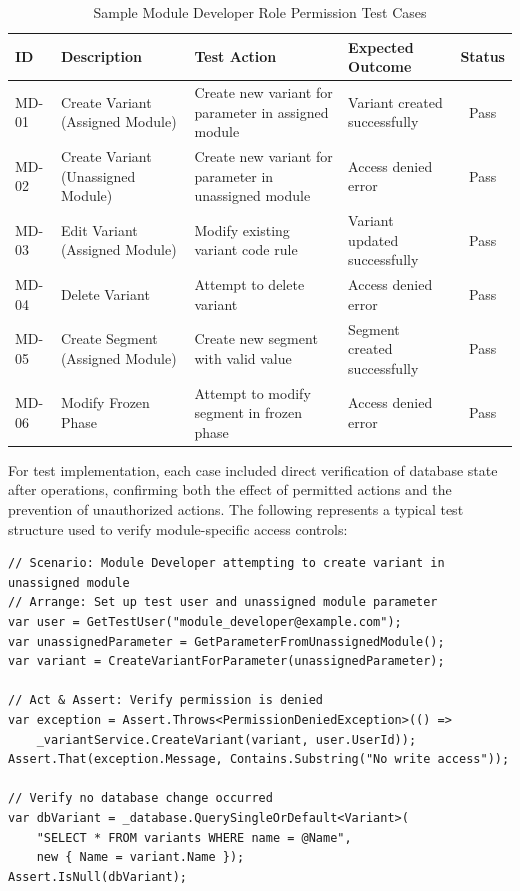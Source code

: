 \begin{table}[H]
\centering
\caption{Sample Module Developer Role Permission Test Cases}
\label{tab:module-dev-test-cases}
\begin{tabular}{|p{0.7cm}|p{3.5cm}|p{3.7cm}|p{3.7cm}|c|}
\hline
\textbf{ID} & \textbf{Description} & \textbf{Test Action} & \textbf{Expected Outcome} & \textbf{Status} \\
\hline
MD-01 & Create Variant (Assigned Module) & Create new variant for parameter in assigned module & Variant created successfully & Pass \\
\hline
MD-02 & Create Variant (Unassigned Module) & Create new variant for parameter in unassigned module & Access denied error & Pass \\
\hline
MD-03 & Edit Variant (Assigned Module) & Modify existing variant code rule & Variant updated successfully & Pass \\
\hline
MD-04 & Delete Variant & Attempt to delete variant & Access denied error & Pass \\
\hline
MD-05 & Create Segment (Assigned Module) & Create new segment with valid value & Segment created successfully & Pass \\
\hline
MD-06 & Modify Frozen Phase & Attempt to modify segment in frozen phase & Access denied error & Pass \\
\hline
\end{tabular}
\end{table}

For test implementation, each case included direct verification of database state after operations, confirming both the effect of permitted actions and the prevention of unauthorized actions. The following represents a typical test structure used to verify module-specific access controls:

\begin{lstlisting}[language=CSharp, caption={Representative Test Case Structure}, label={lst:test-case-structure}]
// Scenario: Module Developer attempting to create variant in unassigned module
// Arrange: Set up test user and unassigned module parameter
var user = GetTestUser("module_developer@example.com");
var unassignedParameter = GetParameterFromUnassignedModule();
var variant = CreateVariantForParameter(unassignedParameter);

// Act & Assert: Verify permission is denied
var exception = Assert.Throws<PermissionDeniedException>(() => 
    _variantService.CreateVariant(variant, user.UserId));
Assert.That(exception.Message, Contains.Substring("No write access"));

// Verify no database change occurred
var dbVariant = _database.QuerySingleOrDefault<Variant>(
    "SELECT * FROM variants WHERE name = @Name", 
    new { Name = variant.Name });
Assert.IsNull(dbVariant);
\end{lstlisting}

